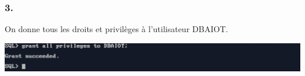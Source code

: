 \subsubsection*{3.}
On donne tous les droits et privilèges à l'utilisateur DBAIOT.



\begin{center}
    \includegraphics[width=\textwidth]{ScreenShot/Partie1/grant.png}
\end{center}

